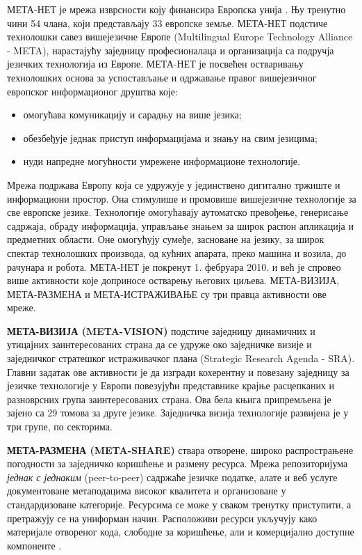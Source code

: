 {\begin{multicols}{2}

МЕТА-НЕТ је мрежа изврсности коју финансира Европска унија \cite{rehm2011}. Њу тренутно чини 54 члана, који представљају 33 европске земље. МЕТА-НЕТ подстиче технолошки савез вишејезичне Европе (Multilingual Europe Technology Alliance - META), нарастајућу заједницу професионалаца и организација са подручја језичких технологија из Европе. 
МЕТА-НЕТ је посвећен остваривању технолошких основа за успостављање и одржавање правог вишејезичног европског информационог друштва које:
\begin{itemize}
\item омогућава комуникацију и сарадњу на више језика; 
\item обезбеђује једнак приступ информацијама и знању на свим језицима;
\item нуди напредне могућности умрежене информационе технологије.
\end{itemize}
Мрежа подржава Европу која се удружује у јединствено дигитално тржиште и информациони простор. Она стимулише и промовише вишејезичне технологије за све европске језике. Технологије омогућавају аутоматско превођење, генерисање садржаја, обраду информација, у\-прав\-ља\-ње знањем за широк распон апликација и предметних области. Оне омогућују сумеђе, засноване на језику, за широк спектар технолошких производа, од кућних апарата, преко машина и возила, до рачунара и робота. 
МЕТА-НЕТ је покренут 1. фебруара 2010. и већ је спровео више активности које доприносе остварењу његових циљева. МЕТА-ВИЗИЈА, МЕТА-РАЗМЕНА и МЕТА-ИСТРАЖИВАЊЕ су три правца активности ове мреже. 

\textbf{МЕТА-ВИЗИЈА (META-VISION)} подстиче заједницу динамичних и утицајних заинтересованих страна да се удруже око заједничке визије и заједничког стратешког истраживачког плана (Strategic Research Agenda - SRA). Главни задатак ове активности је да изгради кохерентну и повезану заједницу за језичке технологије у Европи повезујући представнике крајње расцепканих и разноврсних група заинтересованих страна. Ова бела књига припремљена је зајено са 29 томова за друге језике. Заједничка визија технологије развијена је у три групе, по секторима. 
   
\textbf{МЕТА-РАЗМЕНА (META-SHARE)} ствара отворене, широко распрострањене погодности за заједничко коришћење и размену ресурса. Мрежа репозиторијума \textit{једнак с једнаким} (peer-to-peer) садржаће језичке податке, алате и веб услуге документоване метаподацима високог квалитета и организоване у стандардизоване категорије. Ресурсима се може у сваком тренутку приступити, а претражују се на униформан начин. Расположиви ресурси укључују како материјале отвореног кода, слободне за коришћење, али и комерцијално доступне компоненте . 
   

\end{multicols}}
